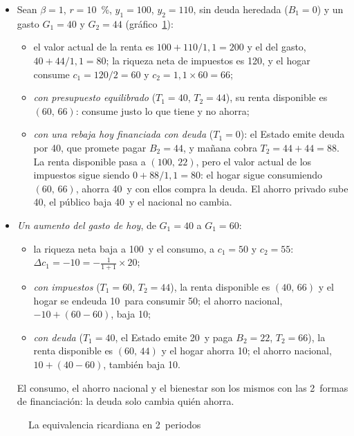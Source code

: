 \documentclass[11pt]{article}
\begin{document}
\begin{itemize}
\item Sean $\beta=1$, $r=10$~\%, $y_1=100$, $y_2=110$, sin deuda heredada ($B_1=0$) y un gasto $G_1=40$ y $G_2=44$ (gráfico~\ref{fig:ricardiana-dos-periodos}):
  \begin{itemize}
  \item el valor actual de la renta es $100+110/1{,}1=200$ y el del gasto, $40+44/1{,}1=80$; la riqueza neta de impuestos es 120, y el hogar consume $c_1=120/2=60$ y $c_2=1{,}1\times60=66$;
  \item \emph{con presupuesto equilibrado} ($T_1=40$, $T_2=44$), su renta disponible es $(60,\,66)$: consume justo lo que tiene y no ahorra;
  \item \emph{con una rebaja hoy financiada con deuda} ($T_1=0$): el Estado emite deuda por 40, que promete pagar $B_2=44$, y mañana cobra $T_2=44+44=88$. La renta disponible pasa a $(100,\,22)$, pero el valor actual de los impuestos sigue siendo $0+88/1{,}1=80$: el hogar sigue consumiendo $(60,\,66)$, ahorra 40~y con ellos compra la deuda. El ahorro privado sube 40, el público baja 40~y el nacional no cambia.
  \end{itemize}
\item \emph{Un aumento del gasto de hoy}, de $G_1=40$ a $G_1=60$:
  \begin{itemize}
  \item la riqueza neta baja a 100~y el consumo, a $c_1=50$ y $c_2=55$: $\Delta c_1=-10=-\frac{1}{1+1}\times20$;
  \item \emph{con impuestos} ($T_1=60$, $T_2=44$), la renta disponible es $(40,\,66)$ y el hogar se endeuda 10~para consumir 50; el ahorro nacional, $-10+(60-60)$, baja 10;
  \item \emph{con deuda} ($T_1=40$, el Estado emite 20~y paga $B_2=22$, $T_2=66$), la renta disponible es $(60,\,44)$ y el hogar ahorra 10; el ahorro nacional, $10+(40-60)$, también baja 10.
  \end{itemize}
  El consumo, el ahorro nacional y el bienestar son los mismos con las 2~formas de financiación: la deuda solo cambia quién ahorra.\findemo
\end{itemize}

\begin{figure}[H]
\centering
\caption{La equivalencia ricardiana en 2~periodos}\label{fig:ricardiana-dos-periodos}
\end{figure}
\end{document}
